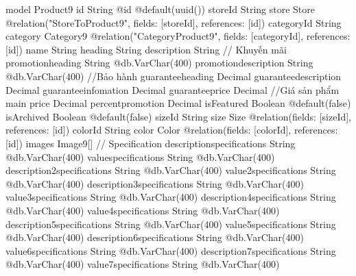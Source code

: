 model Product9 {
  id                           String                         @id @default(uuid())
  storeId                      String
  store                        Store                          @relation("StoreToProduct9", fields: [storeId], references: [id])
  categoryId                   String
  category                     Category9                      @relation("CategoryProduct9", fields: [categoryId], references: [id])
  name                         String
  heading                      String
  description                  String
  // Khuyến mãi
  promotionheading             String                         @db.VarChar(400)
  promotiondescription         String                         @db.VarChar(400)
  //Bảo hành
  guaranteeheading             Decimal
  guaranteedescription         Decimal
  guaranteeinfomation          Decimal
  guaranteeprice               Decimal
  //Giá sản phẩm main
  price                        Decimal
  percentpromotion             Decimal
  isFeatured                   Boolean                        @default(false)
  isArchived                   Boolean                        @default(false)
  sizeId                       String
  size                         Size                           @relation(fields: [sizeId], references: [id])
  colorId                      String
  color                        Color                          @relation(fields: [colorId], references: [id])
  images                       Image9[]
  // Specification
  descriptionspecifications    String                         @db.VarChar(400)
  valuespecifications          String                         @db.VarChar(400)
  description2specifications   String                         @db.VarChar(400)
  value2specifications         String                         @db.VarChar(400)
  description3specifications   String                         @db.VarChar(400)
  value3specifications         String                         @db.VarChar(400)
  description4specifications   String                         @db.VarChar(400)
  value4specifications         String                         @db.VarChar(400)
  description5specifications   String                         @db.VarChar(400)
  value5specifications         String                         @db.VarChar(400)
  description6specifications   String                         @db.VarChar(400)
  value6specifications         String                         @db.VarChar(400)
  description7specifications   String                         @db.VarChar(400)
  value7specifications         String                         @db.VarChar(400)
}
